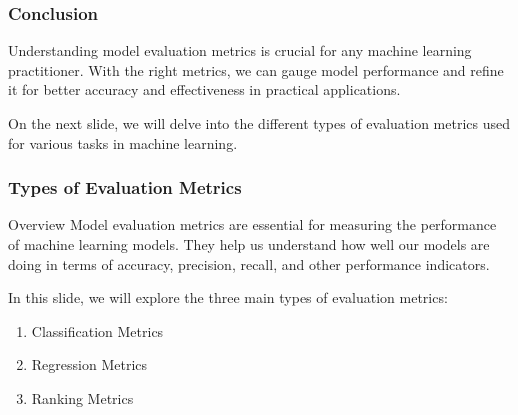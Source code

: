 \documentclass{beamer}
\begin{document}
\begin{frame}[fragile]
    \frametitle{Conclusion}
    Understanding model evaluation metrics is crucial for any machine learning practitioner. 
    With the right metrics, we can gauge model performance and refine it for better accuracy and effectiveness in practical applications.
    
    On the next slide, we will delve into the different types of evaluation metrics used for various tasks in machine learning.
\end{frame}

\begin{frame}[fragile]
    \frametitle{Types of Evaluation Metrics}
    \begin{block}{Overview}
        Model evaluation metrics are essential for measuring the performance of machine learning models. They help us understand how well our models are doing in terms of accuracy, precision, recall, and other performance indicators.
    \end{block}
    In this slide, we will explore the three main types of evaluation metrics:
    \begin{enumerate}
        \item Classification Metrics
        \item Regression Metrics
        \item Ranking Metrics
    \end{enumerate}
\end{frame}
\end{document}
